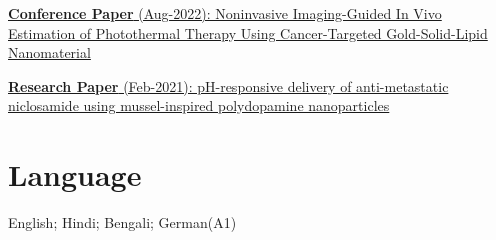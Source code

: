 \documentclass[letterpaper]{deedy-resume} %
\begin{document}
\begin{minipage}[t]{0.62\textwidth}
\begin{tightitemize}
    \vspace{0.5\topsep}
    \item {\href{https://www.thieme-connect.com/products/ejournals/abstract/10.1055/s-0042-1755497}{
        {\bf Conference Paper} 
        (Aug-2022):  Noninvasive Imaging-Guided In Vivo Estimation of Photothermal Therapy Using Cancer-Targeted Gold-Solid-Lipid Nanomaterial}}
    \vspace{0.5\topsep}
    \item {\href{https://pubmed.ncbi.nlm.nih.gov/33540007/}{
        {\bf Research Paper} 
        (Feb-2021):  pH-responsive delivery of anti-metastatic niclosamide using mussel-inspired polydopamine nanoparticles}}
\end{tightitemize}

\sectionspace %
\section{Language}
\vspace{\topsep}
\begin{tightitemize}
    \item English; Hindi; Bengali; German(A1)
\end{tightitemize}


\end{minipage} %








\end{document}
